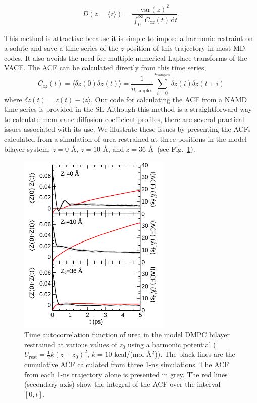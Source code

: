     \begin{equation}
    D(z= \langle z \rangle ) = \frac{\textrm{var}(z)^2}{\displaystyle \int_0^\infty C_{zz}(t) \, \textrm{d}t}.
    \label{eq:diff_hummer}
    \end{equation}

    \par This method is attractive because it is simple to impose a harmonic restraint on a solute and save a time series of the $z$-position of this trajectory in most MD codes. It also avoids the need for multiple numerical Laplace transforms of the VACF. The ACF can be calculated directly from this time series,\cite{Allen1989}
    \begin{equation}
    C_{zz}(t) =  \langle \delta z(0) \delta z(t) \rangle = \frac{1}{n_\mathrm{samples}}\sum\limits_{i=0}^{n_\mathrm{samples}} \delta z(i) \delta z(t+i)
    \label{eq:correlation_sum}
    \end{equation}
    where $\delta z(t) = z(t)-\langle z \rangle$. Our code for calculating the ACF from a NAMD\cite{Phillips2005}
    time series is provided in the SI. 
    Although this method is a straightforward way to calculate membrane diffusion coefficient profiles, there are several practical issues associated with its use. We illustrate these issues by presenting the ACFs calculated from a simulation of urea restrained at three positions in the model bilayer system: $z=0$ \AA, $z=10$ \AA, and $z=36$ \AA\ (see Fig.~\ref{fig:acf}).

    \begin{figure}
    \includegraphics[width=0.65\textwidth]{Figures/acf-stacked}
    \caption{Time autocorrelation function of urea in the model DMPC bilayer 
    restrained at various values of $z_0$ using a harmonic potential 
    ($U_\mathrm{rest}=\frac{1}{2}k(z-z_0)^2$, $k=10$ kcal/(mol \AA$^2$)). 
    The black lines are the cumulative ACF calculated from three 1-ns simulations. 
    The ACF from each 1-ns trajectory alone is presented in grey. The red lines 
    (secondary axis) show the integral of the ACF over the interval $[0,t]$.}
    \label{fig:acf}
    \end{figure}

